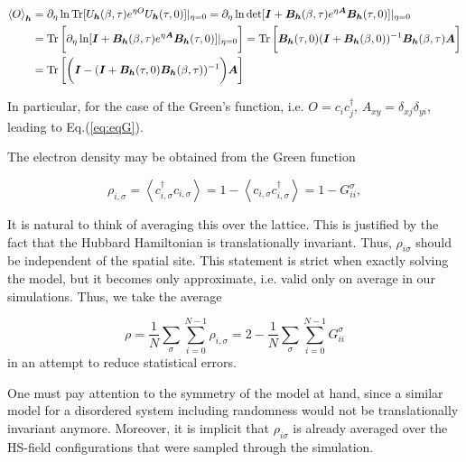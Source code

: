 \begin{equation}
\begin{split}
\left\langle O \right\rangle_{\bm h} &= \partial_\eta \ln \operatorname{Tr} [ U_{\bm h} (\beta, \tau ) e^{\eta O} U_{\bm h} (\tau, 0) ] |_{\eta = 0} = \partial_\eta \ln \det [ \bm I + \bm B_{\bm h} ( \beta, \tau ) e^{\eta \bm A} \bm B_{\bm h} (\tau, 0)  ] |_{\eta = 0} \\
&= \operatorname{Tr} \bigg[ \partial_\eta \ln  [ \bm I + \bm B_{\bm h} ( \beta, \tau ) e^{\eta \bm A} \bm B_{\bm h} (\tau, 0)  ] |_{\eta = 0} \bigg] = \operatorname{Tr} \bigg[ \bm B_{\bm h} (\tau, 0) ( \bm I + \bm B_{\bm h} ( \beta, 0 ) )^{-1} \bm B_{\bm h} ( \beta, \tau ) \bm A \bigg] \\
&= \operatorname{Tr} \bigg[  \bigg( \bm I - ( \bm I + \bm B_{\bm h} ( \tau, 0 ) \bm B_{\bm h} (\beta, \tau) )^{-1} \bigg) \bm A \bigg]
\end{split}
\end{equation}

In particular, for the case of the Green's function, i.e. $O = c_i c_j^\dagger$, $A_{xy} = \delta_{xj} \delta_{yi}$, leading to Eq.(\ref{eq:eqG}).


The electron density may be obtained from the Green function

\begin{equation}
\rho_{i, \sigma} = \left\langle c_{i,\sigma}^\dagger c_{i,\sigma} \right\rangle = 1 - \left\langle c_{i,\sigma} c_{i,\sigma}^\dagger \right\rangle = 1 - G_{ii}^\sigma ,
\end{equation}

It is natural to think of averaging this over the lattice.
This is justified by the fact that the Hubbard Hamiltonian is translationally invariant.
Thus, $\rho_{i\sigma}$ should be independent of the spatial site.
This statement is strict when exactly solving the model, but it becomes only approximate, i.e. valid only on average in our simulations.
Thus, we take the average

\begin{equation}
\rho = \frac{1}{N} \sum_\sigma \sum_{i=0}^{N-1} \rho_{i, \sigma} = 2 - \frac{1}{N} \sum_\sigma \sum_{i=0}^{N-1} G_{ii}^\sigma
\end{equation}
in an attempt to reduce statistical errors.

One must pay attention to the symmetry of the model at hand, since a similar model for a disordered system including randomness would not be translationally invariant anymore.
Moreover, it is implicit that $\rho_{i\sigma}$ is already averaged over the HS-field configurations that were sampled through the simulation.

